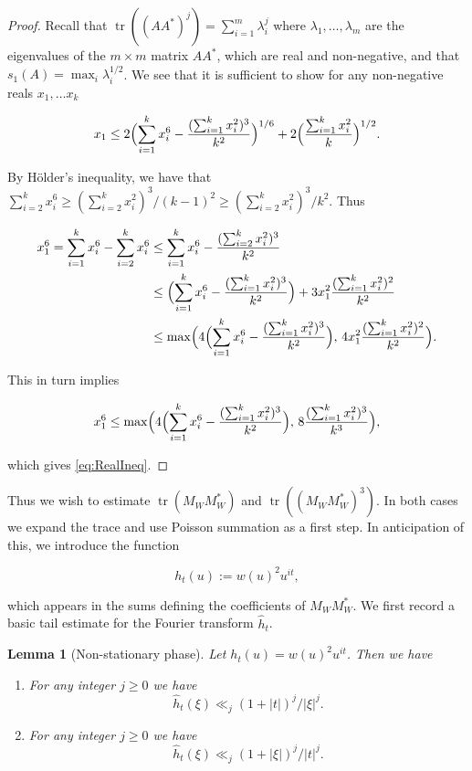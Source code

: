 \documentclass{amsart}
\theoremstyle{plain}
\newtheorem{lmm}[thrm]{Lemma}
\numberwithin{equation}{section}
\DeclareMathOperator*{\tr}{tr}
\begin{document}
\begin{proof}
Recall that $\tr((AA^*)^j)=\sum_{i=1}^m\lambda_i^j$ where $\lambda_1,\dots,\lambda_m$ are the eigenvalues of the $m\times m$ matrix $AA^*$, which are real and non-negative, and that $s_1(A)=\max_i\lambda_i^{1/2}$. We see that it is sufficient to show for any non-negative reals $x_1,\dots x_k$

\begin{equation}
x_1\le 2\Bigl(\sum_{i=1}^k x_i^6-\frac{(\sum_{i=1}^k x_i^2)^3}{k^2}\Bigr)^{1/6}+2\Bigl(\frac{\sum_{i=1}^k x_i^2}{k}\Bigr)^{1/2}.
\label{eq:RealIneq}
\end{equation}

By H\"older's inequality, we have that $\sum_{i=2}^k x_i^6\ge (\sum_{i=2}^k x_i^2)^3/(k-1)^2\ge (\sum_{i=2}^k x_i^2)^3/k^2$. Thus

\begin{align*}
x_1^6=\sum_{i=1}^k x_i^6-\sum_{i=2}^k x_i^6&\le \sum_{i=1}^k x_i^6-\frac{(\sum_{i=2}^k x_i^2)^3}{k^2}\\
&\le \Bigl( \sum_{i=1}^k x_i^6-\frac{(\sum_{i=1}^k x_i^2)^3}{k^2}\Bigr)+3x_1^2\frac{(\sum_{i=1}^k x_i^2)^2}{k^2}\\
&\le \max\Bigl( 4\Bigl(\sum_{i=1}^k x_i^6-\frac{(\sum_{i=1}^k x_i^2)^3}{k^2}\Bigr),\,4x_1^2\frac{(\sum_{i=1}^k x_i^2)^2}{k^2}\Bigr).
\end{align*}

This in turn implies

\[
x_1^6\le \max\Bigl( 4\Bigl(\sum_{i=1}^k x_i^6-\frac{(\sum_{i=1}^k x_i^2)^3}{k^2}\Bigr),\,8\frac{(\sum_{i=1}^k x_i^2)^3}{k^3}\Bigr),
\]

which gives \eqref{eq:RealIneq}.
\end{proof}

Thus we wish to estimate $\tr(M_W M_W^*)$ and $\tr((M_W M_W^*)^3)$. In both cases we expand the trace and use Poisson summation as a first step. In anticipation of this, we introduce the function

\begin{equation}
h_t(u):=w(u)^2u^{it},
\label{eq:htDef}
\end{equation}

which appears in the sums defining the coefficients of $M_WM_W^*$. We first record a basic tail estimate for the Fourier transform $\widehat{h}_t$.

%
%


\begin{lmm}[Non-stationary phase]\label{lmm:Fourier}
Let $h_t(u)=w(u)^2u^{it}$. Then we have
\begin{enumerate}
\item For any integer $j\ge 0$ we have
\[
\widehat{h}_t(\xi)\ll_j (1+|t|)^j/|\xi|^j.
\]
\item For any integer $j\ge 0$ we have
\[
\widehat{h}_t(\xi)\ll_j (1+|\xi|)^j/|t|^j.
\]
\end{enumerate}
\end{lmm}
\end{document}
